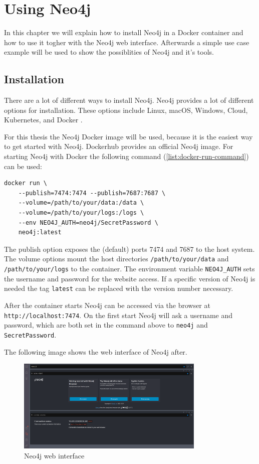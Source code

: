 \section{Using Neo4j}
In this chapter we will explain how to install Neo4j in a Docker container and
how to use it togher with the Neo4j web interface. Afterwards a simple use case
example will be used to show the possiblities of Neo4j and it's tools.

\subsection{Installation}
There are a lot of different ways to install Neo4j. Neo4j provides a lot of
different options for installation. These options include Linux, macOS, Windows, Cloud,
Kubernetes, and Docker \parencite{neo4j:installation}.

For this thesis the Neo4j Docker image will be used, because it is the easiest
way to get started with Neo4j. Dockerhub provides an official Neo4j image. For
starting Neo4j with Docker the following command (\autoref{list:docker-run-command}) can be used:
\begin{lstlisting}[caption=Neo4j docker run command,label=list:docker-run-command,basicstyle=\ttfamily]
docker run \
    --publish=7474:7474 --publish=7687:7687 \
    --volume=/path/to/your/data:/data \
    --volume=/path/to/your/logs:/logs \ 
    --env NEO4J_AUTH=neo4j/SecretPassword \
    neo4j:latest
\end{lstlisting}
The publish option exposes the (default) ports 7474 and 7687 to the host system.
The volume options mount the host directories \texttt{/path/to/your/data} and
\texttt{/path/to/your/logs} to the container. The environment variable
\texttt{NEO4J\_AUTH} sets the username and password for the website access. If a
specific version of Neo4j is needed the tag \texttt{latest} can be replaced with
the version number necessary.

After the container starts Neo4j can be accessed via the browser at \\
\texttt{http://localhost:7474}. On the first start Neo4j will ask a username and
password, which are both set in the command above to \texttt{neo4j} and
\texttt{SecretPassword}.

The following image shows the web interface of Neo4j after.
\begin{figure}[ht]
    \centering
    \includegraphics[width=0.8\textwidth]{images/neo4j-web-interface.png}
    \caption{Neo4j web interface}
    \label{fig:neo4j-web-interface}
\end{figure}

